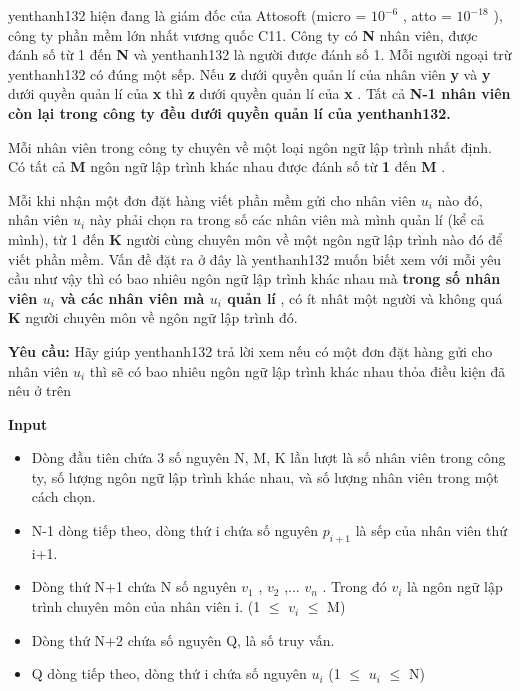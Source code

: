 



yenthanh132   hiện đang là giám đốc của Attosoft (micro = $10^{-6}$   , atto = $10^{-18}$   ), công ty phần mềm lớn nhất vương quốc C11. Công ty có   \textbf{    N   }   nhân viên, được đánh số từ 1 đến   \textbf{    N   }   và   yenthanh132   là người được đánh số 1. Mỗi người ngoại trừ   yenthanh132   có đúng một sếp. Nếu   \textbf{    z   }   dưới quyền quản lí của nhân viên   \textbf{    y   }   và   \textbf{    y   }   dưới quyền quản lí của   \textbf{    x   }   thì   \textbf{    z   }   dưới quyền quản lí của   \textbf{    x   }   .   Tất cả    \textbf{     N-1    nhân viên còn lại trong công ty đều dưới quyền quản lí của yenthanh132.   }

   Mỗi nhân viên trong công ty chuyên về một loại ngôn ngữ lập trình nhất định. Có tất cả   \textbf{    M   }   ngôn ngữ lập trình khác nhau được đánh số từ   \textbf{    1   }   đến   \textbf{    M   }   .  

   Mỗi khi nhận một đơn đặt hàng viết phần mềm gửi cho nhân viên $u_{i}$   nào đó, nhân viên $u_{i}$   này phải chọn ra trong số các nhân viên mà mình quản lí (kể cả mình), từ 1 đến   \textbf{    K   }   người cùng chuyên môn về một ngôn ngữ lập trình nào đó để viết phần mềm. Vấn đề đặt ra ở đây là   yenthanh132   muốn biết xem với mỗi yêu cầu như vậy thì có bao nhiêu ngôn ngữ lập trình khác nhau mà   \textbf{    trong số nhân viên $u_{i}$    và các nhân viên mà $u_{i}$    quản lí   }   , có ít nhât một người và không quá   \textbf{    K   }   người chuyên môn về ngôn ngữ lập trình đó.  

\textbf{    Yêu cầu:   }   Hãy giúp   yenthanh132   trả lời xem nếu có một đơn đặt hàng gửi cho nhân viên $u_{i}$   thì sẽ có bao nhiêu ngôn ngữ lập trình khác nhau thỏa điều kiện đã nêu ở trên  

\textbf{    Input   }
\begin{itemize}
	\item     Dòng đầu tiên chứa 3 số nguyên N,      M, K lần lượt là số nhân viên trong công ty, số lượng ngôn ngữ lập trình      khác nhau, và số lượng nhân viên trong một cách chọn.   
	\item     N-1 dòng tiếp theo, dòng thứ i chứa số nguyên      $p_{i+1}$    là sếp của nhân viên thứ i+1.   
	\item     Dòng thứ N+1 chứa N số nguyên $v_{1}$    ,      $v_{2}$    ,... $v_{n}$    . Trong đó $v_{i}$    là ngôn ngữ lập      trình chuyên môn của nhân viên i. (1  $\le$  $v_{i}$     $\le$  M)   
	\item     Dòng thứ N+2 chứa số nguyên Q, là      số truy vấn.   
	\item     Q dòng tiếp theo, dòng thứ i chứa      số nguyên $u_{i}$    (1  $\le$  $u_{i}$     $\le$  N)   
\end{itemize}

